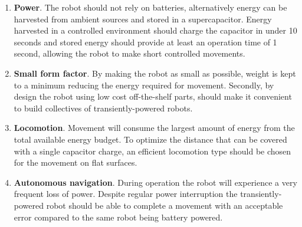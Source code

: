 
\begin{enumerate}
	\item \textbf{Power}. 
	The robot should not rely on batteries, alternatively energy can be harvested from ambient sources and stored in a supercapacitor. 
	Energy harvested in a controlled environment should charge the capacitor in under 10 seconds and stored energy should provide at least an operation time of 1 second, allowing the robot to make short controlled movements.
	
	\item \textbf{Small form factor}. 
	By making the robot as small as possible, weight is kept to a minimum reducing the energy required for movement.
	Secondly, by design the robot using low cost off-the-shelf parts, should make it convenient to build collectives of transiently-powered robots.
	
	\item \textbf{Locomotion}.
	Movement will consume the largest amount of energy from the total available energy budget.
	To optimize the distance that can be covered with a single capacitor charge, an efficient locomotion type should be chosen for the movement on flat surfaces.
	
	\item \textbf{Autonomous navigation}.
	During operation the robot will experience a very frequent loss of power. 
	Despite regular power interruption the transiently-powered robot should be able to complete a movement with an acceptable error compared to the same robot being battery powered.
	
\end{enumerate}
